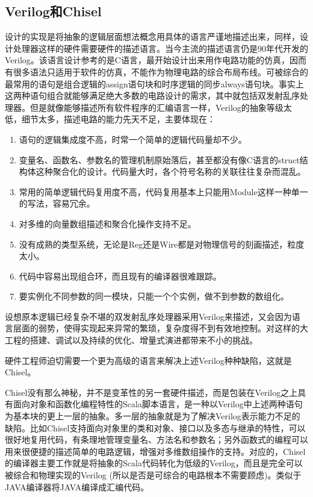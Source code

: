 \subsection{Verilog和Chisel}

设计的实现是将抽象的逻辑层面想法概念用具体的语言严谨地描述出来，同样，设计处理器这样的硬件需要硬件的描述语言。当今主流的描述语言仍是90年代开发的Verilog。该语言设计参考的是C语言，最开始设计出来用作电路功能的仿真，因而有很多语法只适用于软件的仿真，不能作为物理电路的综合布局布线。可被综合的最常用的语句是组合逻辑的assign语句块和时序逻辑的同步always语句块。事实上这两种语句组合就能够满足绝大多数的电路设计的需求，其中就包括双发射乱序处理器。但是就像能够描述所有软件程序的汇编语言一样，Verilog的抽象等级太低，细节太多，描述电路的能力先天不足，主要体现在：
\begin{enumerate}[label=(\alph*)]
	\item 语句的逻辑集成度不高，时常一个简单的逻辑代码量却不少。
	\item 变量名、函数名、参数名的管理机制原始落后，甚至都没有像C语言的struct结构体这种聚合化的设计。代码量大时，各个符号名称的关联往往复杂而混乱。
	\item 常用的简单逻辑代码复用度不高，代码复用基本上只能用Module这样一种单一的写法，容易冗余。
	\item 对多维的向量数组描述和聚合化操作支持不足。
	\item 没有成熟的类型系统，无论是Reg还是Wire都是对物理信号的刻画描述，粒度太小。
	\item 代码中容易出现组合环，而且现有的编译器很难跟踪。
	\item 要实例化不同参数的同一模块，只能一个个实例，做不到参数的数组化。
\end{enumerate}

设想原本逻辑已经复杂不堪的双发射乱序处理器采用Verilog来描述，又会因为语言层面的弱势，使得实现起来异常的繁琐，复杂度得不到有效地控制。对这样的大工程的搭建、调试以及持续的优化、增量式演进都带来不小的挑战。

硬件工程师迫切需要一个更为高级的语言来解决上述Verilog种种缺陷，这就是Chisel。

Chisel没有那么神秘，并不是变革性的另一套硬件描述，而是包装在Verilog之上具有面向对象和函数化编程特性的Scala脚本语言，是一种以Verilog中上述两种语句为基本块的更上一层的抽象。多一层的抽象就是为了解决Verilog表示能力不足的缺陷。比如Chisel支持面向对象里的类和对象、接口以及多态与继承的特性，可以很好地复用代码，有条理地管理变量名、方法名和参数名；另外函数式的编程可以用来很便捷的描述简单的电路逻辑，增强对多维数组操作的支持。对应的，Chisel的编译器主要工作就是将抽象的Scala代码转化为低级的Verilog，而且是完全可以被综合和物理实现的Verilog (所以是否是可综合的电路根本不需要顾虑)。类似于JAVA编译器将JAVA编译成汇编代码。

